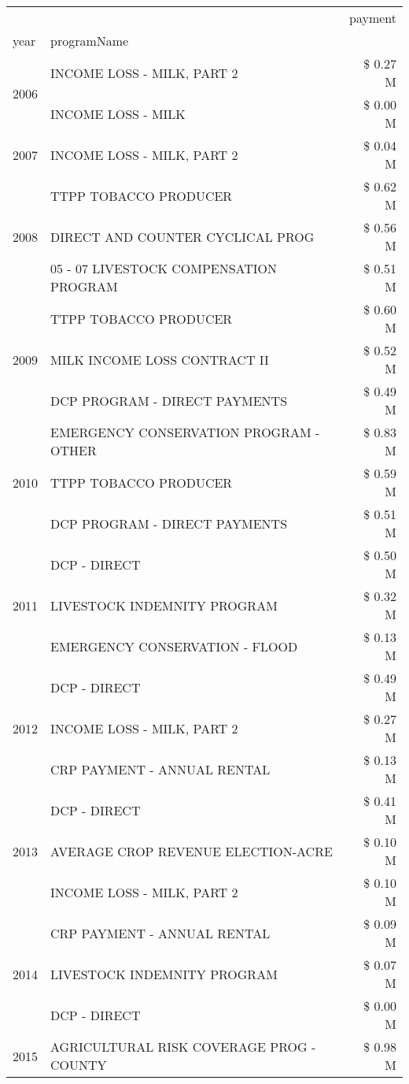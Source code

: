 \begin{tabular}{llr}
\toprule
 &  & payment \\
year & programName &  \\
\midrule
\multirow[t]{2}{*}{2006} & INCOME LOSS - MILK, PART 2 & \$ 0.27 M \\
 & INCOME LOSS - MILK & \$ 0.00 M \\
\cline{1-3}
2007 & INCOME LOSS - MILK, PART 2 & \$ 0.04 M \\
\cline{1-3}
\multirow[t]{3}{*}{2008} & TTPP TOBACCO PRODUCER & \$ 0.62 M \\
 & DIRECT AND COUNTER CYCLICAL PROG & \$ 0.56 M \\
 & 05 - 07 LIVESTOCK COMPENSATION PROGRAM & \$ 0.51 M \\
\cline{1-3}
\multirow[t]{3}{*}{2009} & TTPP TOBACCO PRODUCER & \$ 0.60 M \\
 & MILK INCOME LOSS CONTRACT II & \$ 0.52 M \\
 & DCP PROGRAM - DIRECT PAYMENTS & \$ 0.49 M \\
\cline{1-3}
\multirow[t]{3}{*}{2010} & EMERGENCY CONSERVATION PROGRAM - OTHER & \$ 0.83 M \\
 & TTPP TOBACCO PRODUCER & \$ 0.59 M \\
 & DCP PROGRAM - DIRECT PAYMENTS & \$ 0.51 M \\
\cline{1-3}
\multirow[t]{3}{*}{2011} & DCP - DIRECT & \$ 0.50 M \\
 & LIVESTOCK INDEMNITY PROGRAM & \$ 0.32 M \\
 & EMERGENCY CONSERVATION - FLOOD & \$ 0.13 M \\
\cline{1-3}
\multirow[t]{3}{*}{2012} & DCP - DIRECT & \$ 0.49 M \\
 & INCOME LOSS - MILK, PART 2 & \$ 0.27 M \\
 & CRP PAYMENT - ANNUAL RENTAL & \$ 0.13 M \\
\cline{1-3}
\multirow[t]{3}{*}{2013} & DCP - DIRECT & \$ 0.41 M \\
 & AVERAGE CROP REVENUE ELECTION-ACRE & \$ 0.10 M \\
 & INCOME LOSS - MILK, PART 2 & \$ 0.10 M \\
\cline{1-3}
\multirow[t]{3}{*}{2014} & CRP PAYMENT - ANNUAL RENTAL & \$ 0.09 M \\
 & LIVESTOCK INDEMNITY PROGRAM & \$ 0.07 M \\
 & DCP - DIRECT & \$ 0.00 M \\
\cline{1-3}
\multirow[t]{3}{*}{2015} & AGRICULTURAL RISK COVERAGE PROG - COUNTY & \$ 0.98 M \\

\end{tabular}
